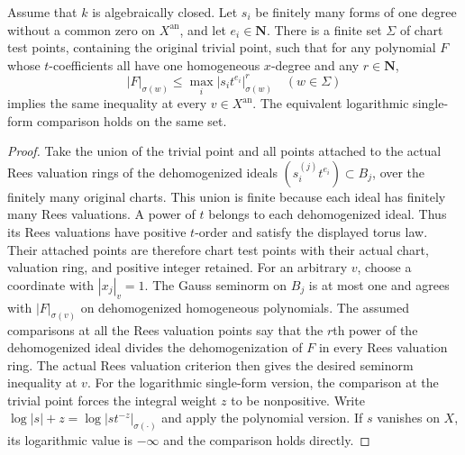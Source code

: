 \begin{lemma}
\label{lem:c0n-chart-shilov-core}
\leanok
Assume that $k$ is algebraically closed.  Let $s_i$ be finitely many forms
of one degree without a common zero on
$X^{\mathrm{an}}$, and let $e_i\in\mathbf N$.
There is a finite set $\Sigma$ of chart test points, containing the
original trivial point, such that for any polynomial $F$ whose
$t$-coefficients all have one homogeneous $x$-degree and any $r\in\mathbf N$,
\[
 |F|_{\sigma(w)}\le\max_i|s_it^{e_i}|_{\sigma(w)}^r
 \quad(w\in\Sigma)
\]
implies the same inequality at every $v\in X^{\mathrm{an}}$.
The equivalent logarithmic single-form comparison holds on the same set.
\end{lemma}
\begin{proof}
Take the union of the trivial point and all points attached to the actual
Rees valuation rings of the dehomogenized ideals
$(s_i^{(j)}t^{e_i})\subset B_j$, over the finitely many original charts.
This union is finite because each ideal has finitely many Rees valuations.
A power of $t$ belongs to each dehomogenized ideal.  Thus its Rees
valuations have positive $t$-order and satisfy the displayed torus law.
Their attached points are therefore chart test points with their actual
chart, valuation ring, and positive integer retained.
For an arbitrary $v$, choose a coordinate with $|x_j|_v=1$.
The Gauss seminorm on $B_j$ is at most one and agrees with
$|F|_{\sigma(v)}$ on dehomogenized homogeneous polynomials.
The assumed comparisons at all the Rees valuation points say that the
$r$th power of the dehomogenized ideal divides the dehomogenization of
$F$ in every Rees valuation ring.  The actual Rees valuation criterion
then gives the desired seminorm inequality at $v$.
For the logarithmic single-form version, the comparison at the trivial
point forces the integral weight $z$ to be nonpositive.  Write
$\log|s|+z=\log|st^{-z}|_{\sigma(\cdot)}$ and apply the polynomial version.
If $s$ vanishes on $X$, its logarithmic value is $-\infty$ and the
comparison holds directly.
\end{proof}

